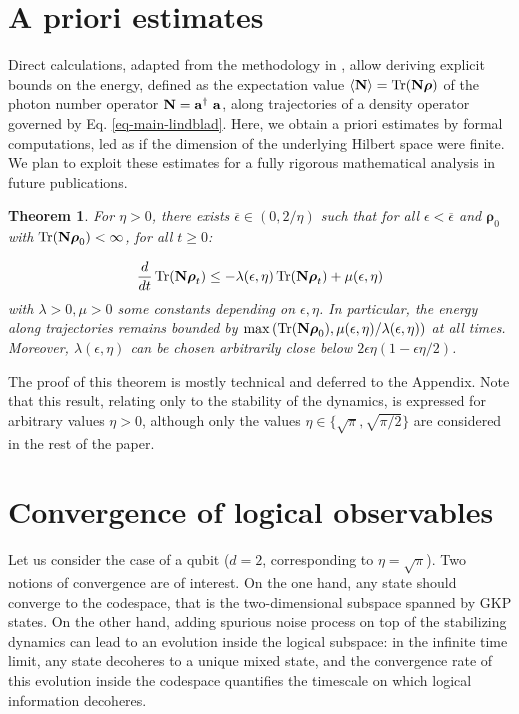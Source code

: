 \documentclass[a4paper, 11pt]{article}
\newcommand{\orho}{{\boldsymbol \rho}}
\newcommand{\oN}{{\bf N}}
\newcommand{\oa}{{\bf a}}
\DeclareMathOperator{\tr}{Tr}
\newtheorem{theorem}{Theorem}
\begin{document}
\section{A priori estimates}
\label{sec-stab}
Direct calculations, adapted from the methodology in \cite{sellemStabilityDecoherence2023}, allow deriving explicit bounds on the energy, defined
as the expectation value $\langle \oN \rangle = \tr(\oN\orho)$ of the photon
number operator $\oN =\oa^\dagger \oa$, along trajectories of a density operator governed by Eq. \eqref{eq-main-lindblad}.
Here, we obtain a priori estimates by formal computations,
led as if the dimension of the underlying Hilbert space
were finite. We plan to exploit these estimates for a fully
rigorous mathematical analysis in future publications.
\begin{theorem}
    For $\eta>0$, there exists $\overline \epsilon \in (0,2/\eta)$ such that for all $\epsilon<\overline \epsilon$ and $\orho_0$ with $\tr(\oN \orho_0) < \infty$, for all $t\geq 0$:

\begin{equation}
\frac{d}{dt}\tr(\oN \orho_t) \leq -\lambda(\epsilon,\eta) \tr(\oN \orho_t) + \mu(\epsilon,\eta)
\label{eq-bound-N}
\end{equation}
with $\lambda>0, \mu>0$ some constants depending on $\epsilon, \eta$.
%
In particular, the energy along trajectories remains bounded by $\max \left(\tr(\oN \orho_0), \mu(\epsilon,\eta)/\lambda(\epsilon,\eta) \right)$ at all times. Moreover, $\lambda(\epsilon,\eta)$ can be chosen arbitrarily close below $2\epsilon\eta (1-\epsilon\eta/2)$.
\end{theorem}\vspace{0.5em}
The proof of this theorem is mostly technical and deferred to the Appendix.
Note that this result, relating only to the stability of the dynamics, is expressed for arbitrary values $\eta>0$, although only the values $\eta\in\{\sqrt\pi, \sqrt{\pi/2}\}$ are considered in the rest of the paper.

\section{Convergence of logical observables}
\label{sec-log}

Let us consider the case of a qubit ($d=2$, corresponding to $\eta = \sqrt\pi$). Two notions of convergence are of interest. On the one hand, any state should converge to the codespace, that is the two-dimensional subspace spanned by GKP states. On the other hand, adding spurious noise process on top of the stabilizing dynamics can lead to an evolution inside the logical subspace:  in the infinite time limit, any state decoheres to a unique mixed state, and the convergence rate of this evolution inside the codespace quantifies the timescale on which logical information decoheres.
\end{document}
